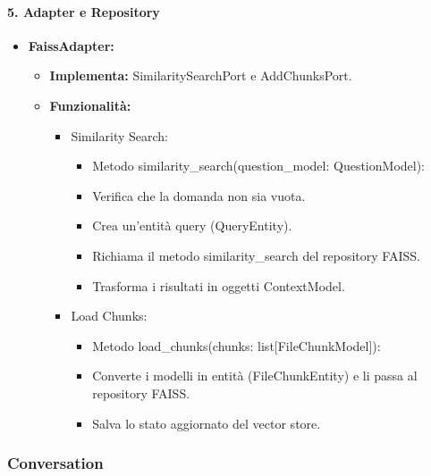     \paragraph{5. Adapter e Repository}
    \begin{itemize}
        \item \textbf{FaissAdapter:}
        \begin{itemize}
            \item \textbf{Implementa:} SimilaritySearchPort e AddChunksPort.
            \item \textbf{Funzionalità:}
            \begin{itemize}
                \item Similarity Search:
                \begin{itemize}
                    \item Metodo similarity\_search(question\_model: QuestionModel):
                    \item Verifica che la domanda non sia vuota.
                    \item Crea un’entità query (QueryEntity).
                    \item Richiama il metodo similarity\_search del repository FAISS.
                    \item Trasforma i risultati in oggetti ContextModel.
                \end{itemize}
                \item Load Chunks:
                \begin{itemize}
                    \item Metodo load\_chunks(chunks: list[FileChunkModel]):
                    \item Converte i modelli in entità (FileChunkEntity) e li passa al repository FAISS.
                    \item Salva lo stato aggiornato del vector store.
                \end{itemize}
            \end{itemize}
        \end{itemize}
    \end{itemize}

    \subsubsection{Conversation}

